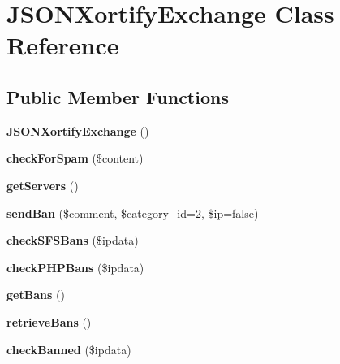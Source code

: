 \hypertarget{class_j_s_o_n_xortify_exchange}{\section{J\-S\-O\-N\-Xortify\-Exchange Class Reference}
\label{class_j_s_o_n_xortify_exchange}
}
\subsection*{Public Member Functions}
\begin{DoxyCompactItemize}
\item 
\hypertarget{class_j_s_o_n_xortify_exchange_a5b94fbd0db11c88aaac5a4d6025957c5}{{\bfseries J\-S\-O\-N\-Xortify\-Exchange} ()}\label{class_j_s_o_n_xortify_exchange_a5b94fbd0db11c88aaac5a4d6025957c5}

\item 
\hypertarget{class_j_s_o_n_xortify_exchange_a7a4f53c3841dc7806455261af557d514}{{\bfseries check\-For\-Spam} (\$content)}\label{class_j_s_o_n_xortify_exchange_a7a4f53c3841dc7806455261af557d514}

\item 
\hypertarget{class_j_s_o_n_xortify_exchange_a882f365bc81e207dc2123ef707735e82}{{\bfseries get\-Servers} ()}\label{class_j_s_o_n_xortify_exchange_a882f365bc81e207dc2123ef707735e82}

\item 
\hypertarget{class_j_s_o_n_xortify_exchange_a0293acfa4afe0cb5b2816352a35d8ca7}{{\bfseries send\-Ban} (\$comment, \$category\-\_\-id=2, \$ip=false)}\label{class_j_s_o_n_xortify_exchange_a0293acfa4afe0cb5b2816352a35d8ca7}

\item 
\hypertarget{class_j_s_o_n_xortify_exchange_a985a563a84e3e5c54694fcce192bda53}{{\bfseries check\-S\-F\-S\-Bans} (\$ipdata)}\label{class_j_s_o_n_xortify_exchange_a985a563a84e3e5c54694fcce192bda53}

\item 
\hypertarget{class_j_s_o_n_xortify_exchange_aeb1bf9aaee4718870adbd07333490aaf}{{\bfseries check\-P\-H\-P\-Bans} (\$ipdata)}\label{class_j_s_o_n_xortify_exchange_aeb1bf9aaee4718870adbd07333490aaf}

\item 
\hypertarget{class_j_s_o_n_xortify_exchange_aea26db2906896833d32445a698fc4cdc}{{\bfseries get\-Bans} ()}\label{class_j_s_o_n_xortify_exchange_aea26db2906896833d32445a698fc4cdc}

\item 
\hypertarget{class_j_s_o_n_xortify_exchange_a4af29af927aae9aada97ef0c2cd08fa1}{{\bfseries retrieve\-Bans} ()}\label{class_j_s_o_n_xortify_exchange_a4af29af927aae9aada97ef0c2cd08fa1}

\item 
\hypertarget{class_j_s_o_n_xortify_exchange_ae41df0f26620b727f7f63342648f6474}{{\bfseries check\-Banned} (\$ipdata)}\label{class_j_s_o_n_xortify_exchange_ae41df0f26620b727f7f63342648f6474}

\end{DoxyCompactItemize}
